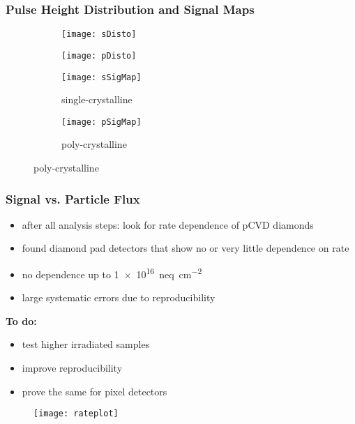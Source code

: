 \begin{frame}
	\frametitle{Pulse Height Distribution and Signal Maps}
	\vspace*{-7.5pt}
	\def \sp {0.65\textwidth}
	\begin{figure}
		\centering
		\begin{subfigure}{0.45\textwidth} 
			\centering 
			\texttt{[image: sDisto]}
		\end{subfigure}
		\begin{subfigure}{0.45\textwidth} 
			\centering 
			\texttt{[image: pDisto]}
		\end{subfigure}
	\end{figure}
	\vspace*{-15pt}
	\begin{figure}
	\centering
		\begin{subfigure}{0.45\textwidth} 
			\centering 
			\texttt{[image: sSigMap]}
			\caption{single-crystalline}
		\end{subfigure}
		\begin{subfigure}{0.45\textwidth} 
			\centering 
			\texttt{[image: pSigMap]}
			\caption{poly-crystalline}
		\end{subfigure} 
	\end{figure}
\end{frame}
\begin{frame}
	\frametitle{Signal vs. Particle Flux}
	\begin{minipage}[c][.75\textheight]{.5\textwidth}
		\begin{itemize}
			\setlength{\itemsep}{\fill}
			\item after all analysis steps: look for rate dependence of pCVD diamonds
			\item found diamond pad detectors that show no or very little dependence on rate
			\item no dependence up to \SI{1e16}{neq\per cm^2}
			\item large systematic errors due to reproducibility
		\end{itemize}
		\vspace*{3pt}
		\textbf{To do:}
		\begin{itemize}
			\setlength{\itemsep}{\fill}
			\item test higher irradiated samples
			\item improve reproducibility
			\item prove the same for pixel detectors
		\end{itemize}
	\end{minipage}
	\hspace*{5pt}
	\begin{minipage}{.45\textwidth}
		\begin{figure}
			\centering
			\texttt{[image: rateplot]}
		\end{figure}
	\end{minipage}
\end{frame}
